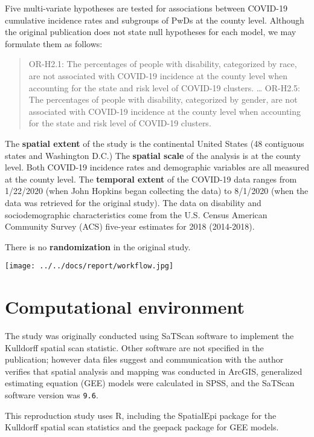 \documentclass[
]{article}
\begin{document}
Five multi-variate hypotheses are tested for associations between
COVID-19 cumulative incidence rates and subgroups of PwDs at the county
level. Although the original publication does not state null hypotheses
for each model, we may formulate them as follows:

\begin{quote}
OR-H2.1: The percentages of people with disability, categorized by race,
are not associated with COVID-19 incidence at the county level when
accounting for the state and risk level of COVID-19 clusters. \ldots{}
OR-H2.5: The percentages of people with disability, categorized by
gender, are not associated with COVID-19 incidence at the county level
when accounting for the state and risk level of COVID-19 clusters.
\end{quote}

The \textbf{spatial extent} of the study is the continental United
States (48 contiguous states and Washington D.C.) The \textbf{spatial
scale} of the analysis is at the county level. Both COVID-19 incidence
rates and demographic variables are all measured at the county level.
The \textbf{temporal extent} of the COVID-19 data ranges from 1/22/2020
(when John Hopkins began collecting the data) to 8/1/2020 (when the data
was retrieved for the original study). The data on disability and
sociodemographic characteristics come from the U.S. Census American
Community Survey (ACS) five-year estimates for 2018 (2014-2018).

There is no \textbf{randomization} in the original study.

\texttt{[image: ../../docs/report/workflow.jpg]}

\hypertarget{computational-environment}{%
\section{Computational environment}\label{computational-environment}}

The study was originally conducted using SaTScan software to implement
the Kulldorff spatial scan statistic. Other software are not specified
in the publication; however data files suggest and communication with
the author verifies that spatial analysis and mapping was conducted in
ArcGIS, generalized estimating equation (GEE) models were calculated in
SPSS, and the SaTScan software version was \texttt{9.6}.

This reproduction study uses R, including the SpatialEpi package for the
Kulldorff spatial scan statistics and the geepack package for GEE
models.
\end{document}
